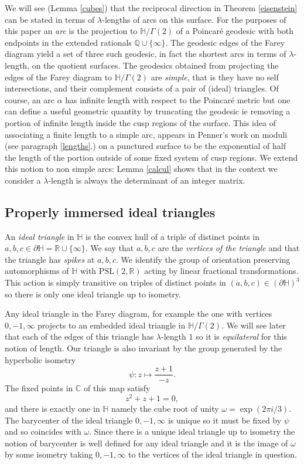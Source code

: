 \documentclass[12pt]{amsart}
\theoremstyle{plain}
\theoremstyle{definition}
\def\HH{\mathbb{H}}
\def\xx{\HH/g2}
\def\CC{\mathbb{C}}
\def\RR{\mathbb{R}}
\def\QQ{\mathbb{Q}}
\def\slr{\mathrm{PSL}(2, \RR)}
\def\g2{\Gamma(2)}
\def\xx{\HH/\g2}
\begin{document}
We will see (Lemma \ref{cubes}) that the reciprocal direction in 
Theorem \ref{eisenstein} can be stated in terms  of  $\lambda$-lengths
 of arcs on  this surface.
 For the purposes of this paper
 an \textit{arc}  
 is the projection to $\xx$ of a 
 Poincar\'e geodesic with both  endpoints in the 
 extended rationals $\QQ \cup \{ \infty\}$.
The geodesic edges of the Farey diagram yield a set of three such geodesic, 
 in fact the shortest arcs
 in terms of $\lambda$-length,  on the quotient surfaces.
The geodesics obtained from projecting the edges of the Farey
diagram to $\xx$
are \textit{simple}, that is they have no self intersections, 
and their complement consists of a pair of (ideal) triangles.
Of course, an arc $\alpha$ has infinite length with respect to the Poincar\'e metric  but one can define a useful geometric quantity   by truncating the geodesic ie removing a portion of infinite length  inside the cusp regions of the surface.
This idea of associating a finite length to a simple arc,
appears in Penner's work on moduli \cite{bob}
 (see paragraph \ref{lengths}.) 
on a punctured
surface to be the exponential of half the 
length of the portion outside of some fixed
system of cusp regions.
We extend this notion to non simple arcs:
Lemma \ref{calcul} shows that in the context we consider
a $\lambda$-length is always the determinant 
of an integer matrix.

\subsection{Properly immersed ideal triangles}

An \textit{ideal triangle} in $\HH$  is the convex hull 
of a triple of distinct points in $a,b,c \in \partial \HH = \RR \cup \{ \infty \}$.
We say that $a,b,c$ are the \textit{vertices of the triangle}
and that the triangle has \textit{spikes} at $a,b,c$.
We identify the  group of orientation preserving automorphisms of $\HH$
 with $\slr$ acting by linear fractional transformations.
This action is simply transitive  on
triples of distinct points in $(a,b,c) \in (\partial \HH)^3$
so there is only one ideal triangle up to isometry.

Any  ideal triangle in the Farey diagram, 
for example the one with vertices $0,-1,\infty$
projects to an embedded ideal triangle in $\xx$.
We will see later that each of the edges
of this triangle has $\lambda$-length $1$
so it is \textit{equilateral} for this notion of length.
Our triangle is also invariant by the group generated by the
hyperbolic isometry
$$ \psi: z \mapsto \frac{z+1}{-z  }.$$
The fixed points in $\CC$ of this map satisfy
$$z^2 + z + 1 = 0,$$
and there is exactly one in $\HH$ 
namely the cube root of unity $\omega= \exp(2\pi i/3)$.
The {barycenter} 
of the ideal triangle $0,-1,\infty$
is unique so it must be fixed by $\psi$ 
and so coincides with $\omega$.
Since there is a unique ideal triangle up to isometry 
the notion of barycenter is well defined for any ideal triangle and
it is the image of $\omega$ by some isometry taking $0,-1,\infty$ to
the vertices of the ideal triangle in question.
\end{document}
